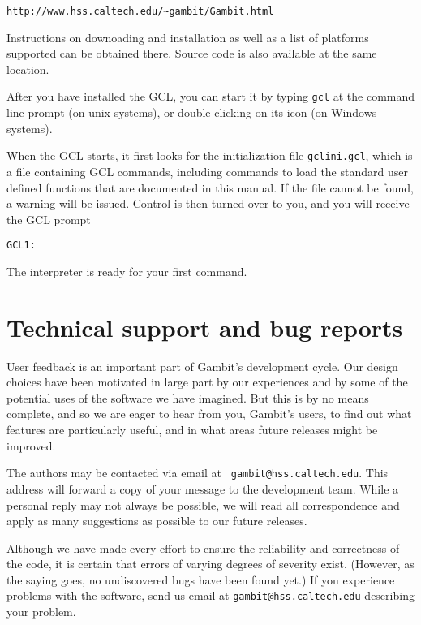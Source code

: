 \begin{verbatim}
http://www.hss.caltech.edu/~gambit/Gambit.html
\end{verbatim} 

\noindent Instructions on downoading and installation as well as a
list of platforms supported can be obtained there.  Source code is
also available at the same location. 

After you have installed the GCL, you can start it by typing
\verb+gcl+ at the command line prompt (on unix systems), or double
clicking on its icon (on Windows systems).

When the GCL starts, it first looks for the initialization file
\verb+gclini.gcl+, which is a file containing GCL commands, including
commands to load the standard user defined functions that are
documented in this manual.  If the file cannot be found, a warning
will be issued.  Control is then turned over to you, and you will
receive the GCL prompt

\begin{verbatim}
GCL1:
\end{verbatim}

\noindent The interpreter is ready for your first command.


\section{Technical support and bug reports}

User feedback is an important part of Gambit's development cycle.  Our
design choices have been motivated in large part by our experiences
and by some of the potential uses of the software we have imagined.
But this is by no means complete, and so we are eager to hear from
you, Gambit's users, to find out what features are particularly
useful, and in what areas future releases might be improved.

The authors may be contacted via email at {\tt
gambit@hss.caltech.edu}.  This address will forward a copy of your
message to the development team.  While a personal reply may not
always be possible, we will read all correspondence and apply as many
suggestions as possible to our future releases.

Although we have made every effort to ensure the reliability and
correctness of the code, it is certain that errors of varying degrees
of severity exist.  (However, as the saying goes, no undiscovered bugs
have been found yet.)  If you experience problems with the software,
send us email at {\tt gambit@hss.caltech.edu} describing your problem.

